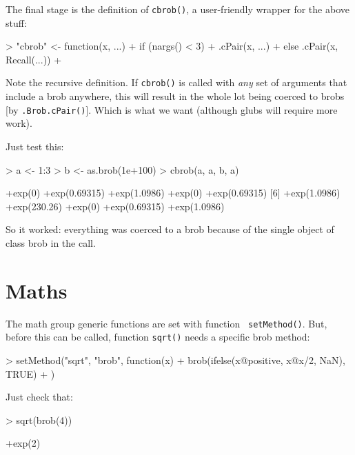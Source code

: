 \documentclass[a4paper]{article}
\begin{document}
The final stage is the definition of {\tt cbrob()}, a user-friendly
wrapper for the above stuff:

\begin{Schunk}
\begin{Sinput}
> "cbrob" <- function(x, ...) {
+     if (nargs() < 3) 
+         .cPair(x, ...)
+     else .cPair(x, Recall(...))
+ }
\end{Sinput}
\end{Schunk}


Note the recursive definition.  If {\tt cbrob()} is called with {\em
any} set of arguments that include a brob anywhere, this will result
in the whole lot being coerced to brobs [by {\tt .Brob.cPair()}].
Which is what we want (although glubs will require more work).


Just test this:
\begin{Schunk}
\begin{Sinput}
> a <- 1:3
> b <- as.brob(1e+100)
> cbrob(a, a, b, a)
\end{Sinput}
\begin{Soutput}
 [1] +exp(0)       +exp(0.69315) +exp(1.0986)  +exp(0)       +exp(0.69315)
 [6] +exp(1.0986)  +exp(230.26)  +exp(0)       +exp(0.69315) +exp(1.0986) 
\end{Soutput}
\end{Schunk}

So it worked: everything was coerced to a brob because of the single
object of class brob in the call.


\section{Maths}

The math group generic functions are set with function {\tt
  setMethod()}.  But, before this can be called, function {\tt sqrt()}
needs a specific brob method:


\begin{Schunk}
\begin{Sinput}
> setMethod("sqrt", "brob", function(x) {
+     brob(ifelse(x@positive, x@x/2, NaN), TRUE)
+ })
\end{Sinput}
\end{Schunk}

Just check that:
\begin{Schunk}
\begin{Sinput}
> sqrt(brob(4))
\end{Sinput}
\begin{Soutput}
[1] +exp(2)
\end{Soutput}
\end{Schunk}
\end{document}
